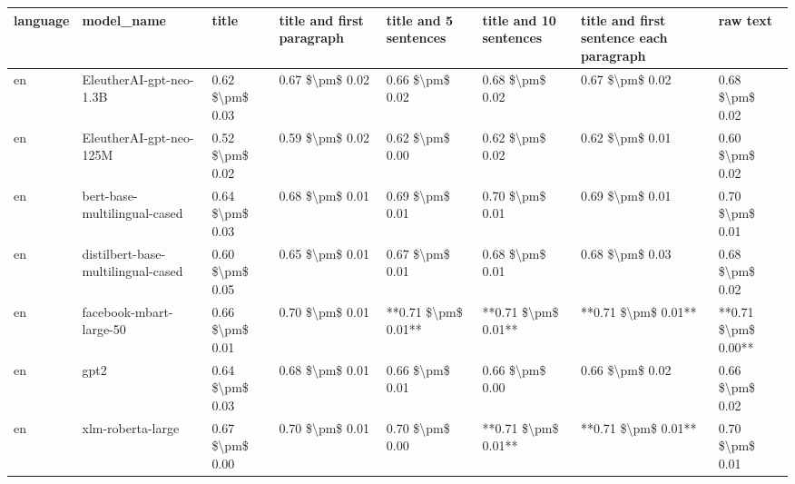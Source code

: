 \begin{tabular}{llllllll}
\toprule
language &                         model\_name &           title & title and first paragraph & title and 5 sentences & title and 10 sentences & title and first sentence each paragraph &            raw text \\
\midrule
      en &            EleutherAI-gpt-neo-1.3B & 0.62 \$\textbackslash pm\$ 0.03 &           0.67 \$\textbackslash pm\$ 0.02 &       0.66 \$\textbackslash pm\$ 0.02 &        0.68 \$\textbackslash pm\$ 0.02 &                         0.67 \$\textbackslash pm\$ 0.02 &     0.68 \$\textbackslash pm\$ 0.02 \\
      en &            EleutherAI-gpt-neo-125M & 0.52 \$\textbackslash pm\$ 0.02 &           0.59 \$\textbackslash pm\$ 0.02 &       0.62 \$\textbackslash pm\$ 0.00 &        0.62 \$\textbackslash pm\$ 0.02 &                         0.62 \$\textbackslash pm\$ 0.01 &     0.60 \$\textbackslash pm\$ 0.02 \\
      en &       bert-base-multilingual-cased & 0.64 \$\textbackslash pm\$ 0.03 &           0.68 \$\textbackslash pm\$ 0.01 &       0.69 \$\textbackslash pm\$ 0.01 &        0.70 \$\textbackslash pm\$ 0.01 &                         0.69 \$\textbackslash pm\$ 0.01 &     0.70 \$\textbackslash pm\$ 0.01 \\
      en & distilbert-base-multilingual-cased & 0.60 \$\textbackslash pm\$ 0.05 &           0.65 \$\textbackslash pm\$ 0.01 &       0.67 \$\textbackslash pm\$ 0.01 &        0.68 \$\textbackslash pm\$ 0.01 &                         0.68 \$\textbackslash pm\$ 0.03 &     0.68 \$\textbackslash pm\$ 0.02 \\
      en &            facebook-mbart-large-50 & 0.66 \$\textbackslash pm\$ 0.01 &           0.70 \$\textbackslash pm\$ 0.01 &   **0.71 \$\textbackslash pm\$ 0.01** &    **0.71 \$\textbackslash pm\$ 0.01** &                     **0.71 \$\textbackslash pm\$ 0.01** & **0.71 \$\textbackslash pm\$ 0.00** \\
      en &                               gpt2 & 0.64 \$\textbackslash pm\$ 0.03 &           0.68 \$\textbackslash pm\$ 0.01 &       0.66 \$\textbackslash pm\$ 0.01 &        0.66 \$\textbackslash pm\$ 0.00 &                         0.66 \$\textbackslash pm\$ 0.02 &     0.66 \$\textbackslash pm\$ 0.02 \\
      en &                  xlm-roberta-large & 0.67 \$\textbackslash pm\$ 0.00 &           0.70 \$\textbackslash pm\$ 0.01 &       0.70 \$\textbackslash pm\$ 0.00 &    **0.71 \$\textbackslash pm\$ 0.01** &                     **0.71 \$\textbackslash pm\$ 0.01** &     0.70 \$\textbackslash pm\$ 0.01 \\

\end{tabular}
